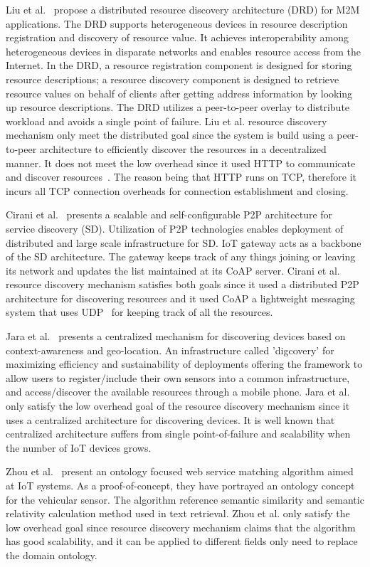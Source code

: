 Liu et al.~\cite{6680268} propose a distributed resource discovery architecture (DRD) for M2M applications. The DRD supports
heterogeneous devices in resource description registration and discovery of resource value. It achieves interoperability among
heterogeneous devices in disparate networks and enables resource access from the Internet. In the DRD, a resource registration component is designed for storing resource descriptions; a resource discovery component is designed to retrieve resource values on behalf of clients after getting address information by looking up resource descriptions. The DRD utilizes a peer-to-peer overlay to distribute workload and avoids a single point of failure. Liu et al. resource discovery mechanism only meet the distributed goal since the system is build using a peer-to-peer architecture to efficiently discover the resources in a decentralized manner. It does not meet the low overhead since it used HTTP to communicate and discover resources~\cite{8088251}. The reason being that HTTP runs on TCP, therefore it incurs all TCP connection overheads for connection establishment and closing.

Cirani et al.~\cite{6899579} presents a scalable and self-configurable P2P architecture for service discovery (SD). Utilization of
P2P technologies enables deployment of distributed and large scale infrastructure for SD. IoT gateway acts as a backbone of the SD architecture. The gateway keeps track of any things joining or leaving its network and updates the list maintained at its CoAP server. Cirani et al. resource discovery mechanism satisfies both goals since it used a distributed P2P architecture for discovering resources and it used CoAP a lightweight messaging system that uses UDP~\cite{8088251} for keeping track of all the resources.

Jara et al.~\cite{6550579} presents a centralized mechanism for discovering devices based on context-awareness and geo-location. An infrastructure called 'digcovery' for maximizing efficiency and sustainability of deployments offering the framework to allow users to register/include their own sensors into a common infrastructure, and access/discover the available resources through a mobile phone. Jara et al. only satisfy the low overhead goal of the resource discovery mechanism since it uses a centralized architecture for discovering devices. It is well known that centralized architecture suffers from single point-of-failure and scalability when the number of IoT devices grows. 

Zhou et al.~\cite{6664533} present an ontology focused web service matching algorithm aimed at IoT systems. As a proof-of-concept, they have portrayed an ontology concept for the vehicular sensor. The algorithm reference semantic similarity and semantic relativity calculation method used in text retrieval. Zhou et al. only satisfy the low overhead goal since resource discovery mechanism claims that the algorithm has good scalability, and it can be applied to different fields only need to replace the domain ontology.

